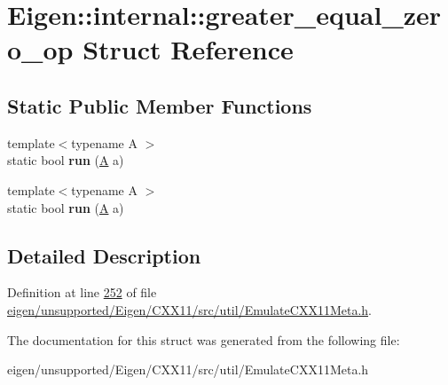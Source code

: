 \hypertarget{struct_eigen_1_1internal_1_1greater__equal__zero__op}{}\section{Eigen\+:\+:internal\+:\+:greater\+\_\+equal\+\_\+zero\+\_\+op Struct Reference}
\label{struct_eigen_1_1internal_1_1greater__equal__zero__op}
\subsection*{Static Public Member Functions}
\begin{DoxyCompactItemize}
\item 
\mbox{\label{struct_eigen_1_1internal_1_1greater__equal__zero__op_a809506e638c345a6f5f2cb9f8c3962ac}} 
{\footnotesize template$<$typename A $>$ }\\static bool {\bfseries run} (\hyperlink{group___core___module_class_eigen_1_1_matrix}{A} a)
\item 
\mbox{\label{struct_eigen_1_1internal_1_1greater__equal__zero__op_a809506e638c345a6f5f2cb9f8c3962ac}} 
{\footnotesize template$<$typename A $>$ }\\static bool {\bfseries run} (\hyperlink{group___core___module_class_eigen_1_1_matrix}{A} a)
\end{DoxyCompactItemize}


\subsection{Detailed Description}


Definition at line \hyperlink{eigen_2unsupported_2_eigen_2_c_x_x11_2src_2util_2_emulate_c_x_x11_meta_8h_source_l00252}{252} of file \hyperlink{eigen_2unsupported_2_eigen_2_c_x_x11_2src_2util_2_emulate_c_x_x11_meta_8h_source}{eigen/unsupported/\+Eigen/\+C\+X\+X11/src/util/\+Emulate\+C\+X\+X11\+Meta.\+h}.



The documentation for this struct was generated from the following file\+:\begin{DoxyCompactItemize}
\item 
eigen/unsupported/\+Eigen/\+C\+X\+X11/src/util/\+Emulate\+C\+X\+X11\+Meta.\+h\end{DoxyCompactItemize}
